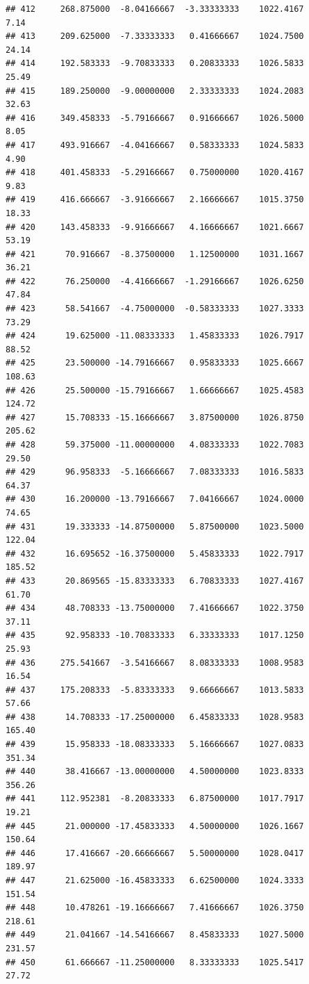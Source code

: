 \documentclass[
]{article}
\begin{document}
\begin{verbatim}
## 412     268.875000  -8.04166667  -3.33333333    1022.4167        7.14
## 413     209.625000  -7.33333333   0.41666667    1024.7500       24.14
## 414     192.583333  -9.70833333   0.20833333    1026.5833       25.49
## 415     189.250000  -9.00000000   2.33333333    1024.2083       32.63
## 416     349.458333  -5.79166667   0.91666667    1026.5000        8.05
## 417     493.916667  -4.04166667   0.58333333    1024.5833        4.90
## 418     401.458333  -5.29166667   0.75000000    1020.4167        9.83
## 419     416.666667  -3.91666667   2.16666667    1015.3750       18.33
## 420     143.458333  -9.91666667   4.16666667    1021.6667       53.19
## 421      70.916667  -8.37500000   1.12500000    1031.1667       36.21
## 422      76.250000  -4.41666667  -1.29166667    1026.6250       47.84
## 423      58.541667  -4.75000000  -0.58333333    1027.3333       73.29
## 424      19.625000 -11.08333333   1.45833333    1026.7917       88.52
## 425      23.500000 -14.79166667   0.95833333    1025.6667      108.63
## 426      25.500000 -15.79166667   1.66666667    1025.4583      124.72
## 427      15.708333 -15.16666667   3.87500000    1026.8750      205.62
## 428      59.375000 -11.00000000   4.08333333    1022.7083       29.50
## 429      96.958333  -5.16666667   7.08333333    1016.5833       64.37
## 430      16.200000 -13.79166667   7.04166667    1024.0000       74.65
## 431      19.333333 -14.87500000   5.87500000    1023.5000      122.04
## 432      16.695652 -16.37500000   5.45833333    1022.7917      185.52
## 433      20.869565 -15.83333333   6.70833333    1027.4167       61.70
## 434      48.708333 -13.75000000   7.41666667    1022.3750       37.11
## 435      92.958333 -10.70833333   6.33333333    1017.1250       25.93
## 436     275.541667  -3.54166667   8.08333333    1008.9583       16.54
## 437     175.208333  -5.83333333   9.66666667    1013.5833       57.66
## 438      14.708333 -17.25000000   6.45833333    1028.9583      165.40
## 439      15.958333 -18.08333333   5.16666667    1027.0833      351.34
## 440      38.416667 -13.00000000   4.50000000    1023.8333      356.26
## 441     112.952381  -8.20833333   6.87500000    1017.7917       19.21
## 445      21.000000 -17.45833333   4.50000000    1026.1667      150.64
## 446      17.416667 -20.66666667   5.50000000    1028.0417      189.97
## 447      21.625000 -16.45833333   6.62500000    1024.3333      151.54
## 448      10.478261 -19.16666667   7.41666667    1026.3750      218.61
## 449      21.041667 -14.54166667   8.45833333    1027.5000      231.57
## 450      61.666667 -11.25000000   8.33333333    1025.5417       27.72

\end{verbatim}
\end{document}
